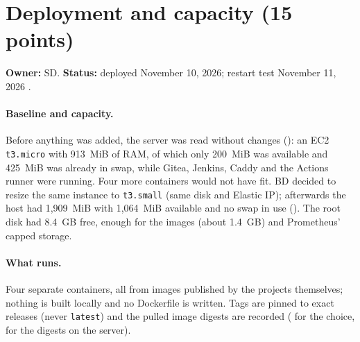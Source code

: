
\section{Deployment and capacity (15 points)}\label{Section:sreDeployment}
\textbf{Owner:} SD. \textbf{Status:} deployed November 10, 2026; restart test November 11, 2026 \StatusPass.

\paragraph{Baseline and capacity.} Before anything was added, the server was read without changes ():
an EC2 \texttt{t3.micro} with 913~MiB of RAM, of which only 200~MiB was available and 425~MiB was already in swap, while
Gitea, Jenkins, Caddy and the Actions runner were running. Four more containers would not have fit. BD decided to resize
the same instance to \texttt{t3.small} (same disk and Elastic IP); afterwards the host had 1,909~MiB with 1,064~MiB
available and no swap in use (). The root disk had 8.4~GB free, enough for the images (about 1.4~GB) and
Prometheus' capped storage.

\paragraph{What runs.} Four separate containers, all from images published by the projects themselves; nothing is built
locally and no Dockerfile is written. Tags are pinned to exact releases (never \texttt{latest}) and the pulled image
digests are recorded ( for the choice,  for the digests on the server).

